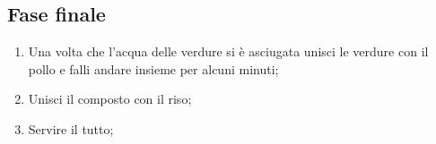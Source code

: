 \subsection{Fase finale}

\begin{enumerate}
    \item Una volta che l'acqua delle verdure si è asciugata unisci le verdure con il pollo e falli andare insieme per alcuni minuti;
    \item Unisci il composto con il riso;
    \item Servire il tutto;
\end{enumerate}


